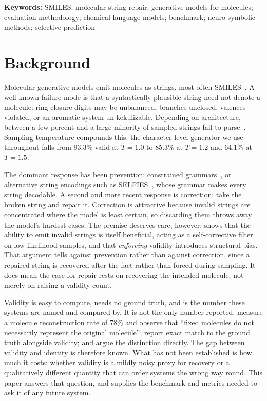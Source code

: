 \documentclass[11pt]{article}
\begin{document}
\vspace{0.5em}
\noindent\textbf{Keywords:} SMILES; molecular string repair; generative models
for molecules; evaluation methodology; chemical language models; benchmark;
neuro-symbolic methods; selective prediction

\section{Background}

Molecular generative models emit molecules as strings, most often
SMILES~\citep{weininger1988smiles}. A well-known failure mode is that a
syntactically plausible string need not denote a molecule: ring-closure digits
may be unbalanced, branches unclosed, valences violated, or an aromatic system
un-kekulizable. Depending on architecture, between a few percent and a large
minority of sampled strings fail to
parse~\citep{brown2019guacamol,polykovskiy2020moses}. Sampling temperature
compounds this: the character-level generator we use throughout falls from
93.3\% valid at $T{=}1.0$ to 85.3\% at $T{=}1.2$ and 64.1\% at $T{=}1.5$.

The dominant response has been prevention: constrained
grammars~\citep{kusner2017grammar,dai2018syntax}, or alternative string
encodings such as SELFIES~\citep{krenn2020selfies}, whose grammar makes every
string decodable. A second and more recent response is correction: take the
broken string and repair it. Correction is attractive because invalid strings are
concentrated where the model is least certain, so discarding them throws away the
model's hardest cases. The premise deserves care, however:
\citet{skinnider2024invalid} shows that the ability to emit invalid strings is
itself beneficial, acting as a self-corrective filter on low-likelihood samples,
and that \emph{enforcing} validity introduces structural bias. That argument
tells against prevention rather than against correction, since a repaired string
is recovered after the fact rather than forced during sampling. It does mean the
case for repair rests on recovering the intended molecule, not merely on raising
a validity count.

Validity is easy to compute, needs no ground truth, and is the number these
systems are named and compared by. It is not the only number reported.
\citet{schoenmaker2023uncorrupt} measure a molecule reconstruction rate of 78\%
and observe that ``fixed molecules do not necessarily represent the original
molecule''; \citet{smiself2025} report exact match to the ground truth alongside
validity; and \citet{amrec} argue the distinction directly. The gap between
validity and identity is therefore known. What has not been established is how
much it costs: whether validity is a mildly noisy proxy for recovery or a
qualitatively different quantity that can order systems the wrong way round.
This paper answers that question, and supplies the benchmark and metrics needed
to ask it of any future system.
\end{document}
